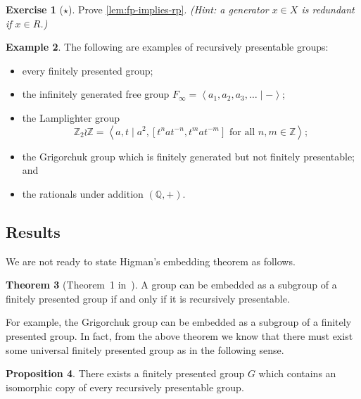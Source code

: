 \documentclass[11pt,a4paper,reqno]{amsart}
\theoremstyle{plain}
\theoremstyle{definition}
\newtheorem{theorem}{Theorem}[section]
\newtheorem{proposition}[theorem]{Proposition}
\theoremstyle{definition}
\newtheorem{exercise}[theorem]{Exercise}
\newtheorem{example}[theorem]{Example}
\newcommand\exerciseLevelEasy{$\star$}
\begin{document}
\begin{exercise}[\exerciseLevelEasy]
  Prove \cref{lem:fp-implies-rp}. \textit{(Hint: a generator $x \in X$ is redundant if $x\in R$.)}
\end{exercise}

\begin{example}
  The following are examples of recursively presentable groups:
\begin{itemize}
	\item every finitely presented group;
	\item the infinitely generated free group $F_\infty = \left\langle a_1, a_2, a_3,\ldots \mid - \right\rangle$;
	\item the Lamplighter group
	      \[
		      \mathbb Z_2 \wr \mathbb Z
		      =
		      \left\langle
		      a,t
		      \mid
		      a^2, [t^n a t^{-n}, t^m a t^{-m}]\text{ for all }n,m\in \mathbb Z
		      \right\rangle;
	      \]
	\item the Grigorchuk group which is finitely generated but not finitely presentable; and
	\item the rationals under addition $(\mathbb Q, +)$.
\end{itemize}
\end{example}

\subsection{Results}
We are not ready to state Higman's embedding theorem as follows.

\begin{theorem}[Theorem~1 in~\cite{higman1961}]\label{thm:higman}
	A group can be embedded as a subgroup of a finitely presented group if and only if it is recursively presentable.
\end{theorem}

For example, the Grigorchuk group can be embedded as a subgroup of a finitely presented group.
In fact, from the above theorem we know that there must exist some universal finitely presented group as in the following sense.

\begin{proposition}\label{lem:universal-pres}
	There exists a finitely presented group $G$ which contains an isomorphic copy of every recursively presentable group.
\end{proposition}
\end{document}
